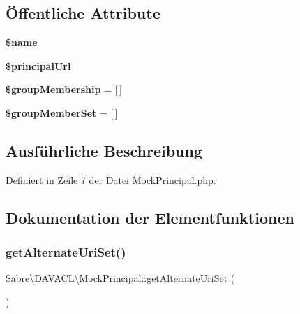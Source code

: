\subsection*{Öffentliche Attribute}
\begin{DoxyCompactItemize}
\item 
\mbox{\label{class_sabre_1_1_d_a_v_a_c_l_1_1_mock_principal_a02966253d4c4955032df9f4519b3601c}} 
{\bfseries \$name}
\item 
\mbox{\label{class_sabre_1_1_d_a_v_a_c_l_1_1_mock_principal_aafc2b40cb74b64db6e73f654ba63e48b}} 
{\bfseries \$principal\+Url}
\item 
\mbox{\label{class_sabre_1_1_d_a_v_a_c_l_1_1_mock_principal_a05b855ad89e89d97e4a918fcdee6ad4a}} 
{\bfseries \$group\+Membership} = \mbox{[}$\,$\mbox{]}
\item 
\mbox{\label{class_sabre_1_1_d_a_v_a_c_l_1_1_mock_principal_a25eacf4059feee0c250a063ba9b18265}} 
{\bfseries \$group\+Member\+Set} = \mbox{[}$\,$\mbox{]}
\end{DoxyCompactItemize}


\subsection{Ausführliche Beschreibung}


Definiert in Zeile 7 der Datei Mock\+Principal.\+php.



\subsection{Dokumentation der Elementfunktionen}
\mbox{\label{class_sabre_1_1_d_a_v_a_c_l_1_1_mock_principal_ac08570a6235b4455752d68a245b654b0}} 
\subsubsection{\texorpdfstring{get\+Alternate\+Uri\+Set()}{getAlternateUriSet()}}
{\footnotesize\ttfamily Sabre\textbackslash{}\+D\+A\+V\+A\+C\+L\textbackslash{}\+Mock\+Principal\+::get\+Alternate\+Uri\+Set (\begin{DoxyParamCaption}{ }\end{DoxyParamCaption})}

